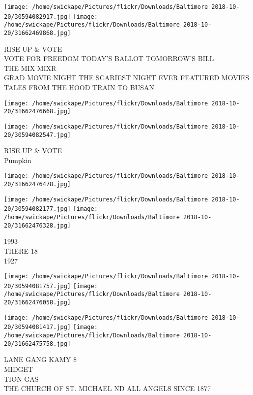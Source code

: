 \documentclass[10pt,letterpaper]{article}
\begin{document}
\texttt{[image: /home/swickape/Pictures/flickr/Downloads/Baltimore 2018-10-20/30594082917.jpg]}
\texttt{[image: /home/swickape/Pictures/flickr/Downloads/Baltimore 2018-10-20/31662469868.jpg]}

RISE UP \& VOTE\\
VOTE FOR FREEDOM TODAY'S BALLOT TOMORROW'S BILL\\
THE MIX MIXR\\
GRAD MOVIE NIGHT THE SCARIEST NIGHT EVER FEATURED MOVIES TALES FROM THE HOOD TRAIN TO BUSAN\\
\pagebreak

\texttt{[image: /home/swickape/Pictures/flickr/Downloads/Baltimore 2018-10-20/31662476668.jpg]}

\vspace{0.25in}
\texttt{[image: /home/swickape/Pictures/flickr/Downloads/Baltimore 2018-10-20/30594082547.jpg]}

RISE UP \& VOTE\\
Pumpkin\\
\pagebreak

\texttt{[image: /home/swickape/Pictures/flickr/Downloads/Baltimore 2018-10-20/31662476478.jpg]}

\vspace{0.25in}
\texttt{[image: /home/swickape/Pictures/flickr/Downloads/Baltimore 2018-10-20/30594082177.jpg]}
\texttt{[image: /home/swickape/Pictures/flickr/Downloads/Baltimore 2018-10-20/31662476328.jpg]}

1993\\
THERE 18\\
1927\\
\pagebreak

\texttt{[image: /home/swickape/Pictures/flickr/Downloads/Baltimore 2018-10-20/30594081757.jpg]}
\texttt{[image: /home/swickape/Pictures/flickr/Downloads/Baltimore 2018-10-20/31662476058.jpg]}

\texttt{[image: /home/swickape/Pictures/flickr/Downloads/Baltimore 2018-10-20/30594081417.jpg]}
\texttt{[image: /home/swickape/Pictures/flickr/Downloads/Baltimore 2018-10-20/31662475758.jpg]}

LANE GANG KAMY \$\\
MIDGET\\
TION GAS\\
THE CHURCH OF ST. MICHAEL ND ALL ANGELS SINCE 1877\\
\pagebreak
\end{document}
